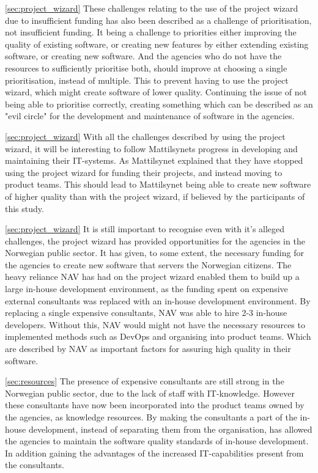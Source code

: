 \autoref{sec:project_wizard} These challenges relating to the use of the project wizard due to insufficient funding has also been described as a challenge of prioritisation, not insufficient funding. It being a challenge to priorities either improving the quality of existing software, or creating new features by either extending existing software, or creating new software. And the agencies who do not have the resources to sufficiently prioritise both, should improve at choosing a single prioritisation, instead of multiple. This to prevent having to use the project wizard, which might create software of lower quality. Continuing the issue of not being able to prioritise correctly, creating something which can be described as an "evil circle" for the development and maintenance of software in the agencies.

\autoref{sec:project_wizard} With all the challenges described by using the project wizard, it will be interesting to follow Mattilsynets progress in developing and maintaining their IT-systems. As Mattilsynet explained that they have stopped using the project wizard for funding their projects, and instead moving to product teams. This should lead to Mattilsynet being able to create new software of higher quality than with the project wizard, if believed by the participants of this study.

\autoref{sec:project_wizard} It is still important to recognise even with it's alleged challenges, the project wizard has provided opportunities for the agencies in the Norwegian public sector. It has given, to some extent, the necessary funding for the agencies to create new software that servers the Norwegian citizens. The heavy reliance NAV has had on the project wizard enabled them to build up a large in-house development environment, as the funding spent on expensive external consultants was replaced with an in-house development environment. By replacing a single expensive consultants, NAV was able to hire 2-3 in-house developers. Without this, NAV would might not have the necessary resources to implemented methods such as DevOps and organising into product teams. Which are described by NAV as important factors for assuring high quality in their software.

\autoref{sec:resources} The presence of expensive consultants are still strong in the Norwegian public sector, due to the lack of staff with IT-knowledge. However these consultants have now been incorporated into the product teams owned by the agencies, as knowledge resources. By making the consultants a part of the in-house development, instead of separating them from the organisation, has allowed the agencies to maintain the software quality standards of in-house development. In addition gaining the advantages of the increased IT-capabilities present from the consultants.

